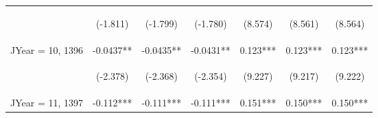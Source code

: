 \documentclass[]{article}
\begin{document}
\begin{center}
\begin{tabular}{lcccccc}
        \vspace{4pt}     & \begin{footnotesize}(-1.811)\end{footnotesize} & \begin{footnotesize}(-1.799)\end{footnotesize} & \begin{footnotesize}(-1.780)\end{footnotesize} & \begin{footnotesize}(8.574)\end{footnotesize}  & \begin{footnotesize}(8.561)\end{footnotesize}  & \begin{footnotesize}(8.564)\end{footnotesize}  \\
        JYear = 10, 1396 & -0.0437**                                      & -0.0435**                                      & -0.0431**                                      & 0.123***                                       & 0.123***                                       & 0.123***                                       \\
        \vspace{4pt}     & \begin{footnotesize}(-2.378)\end{footnotesize} & \begin{footnotesize}(-2.368)\end{footnotesize} & \begin{footnotesize}(-2.354)\end{footnotesize} & \begin{footnotesize}(9.227)\end{footnotesize}  & \begin{footnotesize}(9.217)\end{footnotesize}  & \begin{footnotesize}(9.222)\end{footnotesize}  \\
        JYear = 11, 1397 & -0.112***                                      & -0.111***                                      & -0.111***                                      & 0.151***                                       & 0.150***                                       & 0.150***                                       \\

\end{tabular}
\end{center}
\end{document}
